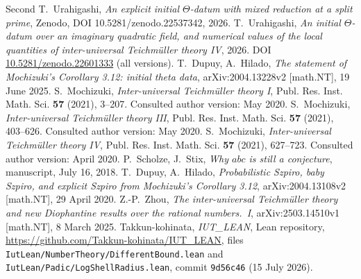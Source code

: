 \documentclass[11pt]{article}
\theoremstyle{plain}
\theoremstyle{definition}
\begin{document}
\begin{thebibliography}{Second}
 T.~Urahigashi, \emph{An explicit initial $\Theta$-datum with
 mixed reduction at a split prime}, Zenodo, DOI 10.5281/zenodo.22537342, 2026.
 T.~Urahigashi, \emph{An initial $\Theta$-datum over an
 imaginary quadratic field, and numerical values of the local quantities of
 inter-universal Teichm\"uller theory IV}, 2026.
 DOI \href{https://doi.org/10.5281/zenodo.22601333}{10.5281/zenodo.22601333}
 (all versions).
 T.~Dupuy, A.~Hilado, \emph{The statement of Mochizuki's
 Corollary 3.12: initial theta data}, arXiv:2004.13228v2 [math.NT], 19 June 2025.
 S.~Mochizuki, \emph{Inter-universal Teichm\"uller theory I},
 Publ. Res. Inst. Math. Sci. \textbf{57} (2021), 3--207.
 Consulted author version: May 2020.
 S.~Mochizuki, \emph{Inter-universal Teichm\"uller theory III},
 Publ. Res. Inst. Math. Sci. \textbf{57} (2021), 403--626.
 Consulted author version: May 2020.
 S.~Mochizuki, \emph{Inter-universal Teichm\"uller theory IV},
 Publ. Res. Inst. Math. Sci. \textbf{57} (2021), 627--723.
 Consulted author version: April 2020.
 P.~Scholze, J.~Stix, \emph{Why $abc$ is still a conjecture},
 manuscript, July 16, 2018.
 T.~Dupuy, A.~Hilado, \emph{Probabilistic Szpiro, baby Szpiro,
 and explicit Szpiro from Mochizuki's Corollary 3.12}, arXiv:2004.13108v2 [math.NT],
 29 April 2020.
 Z.-P.~Zhou, \emph{The inter-universal Teichm\"uller theory and new
 Diophantine results over the rational numbers.~I}, arXiv:2503.14510v1 [math.NT],
 8 March 2025.
 Takkun-kohinata, \emph{IUT\_LEAN}, Lean repository,
 \url{https://github.com/Takkun-kohinata/IUT_LEAN}, files
 \texttt{IutLean/NumberTheory/DifferentBound.lean} and
 \texttt{IutLean/Padic/LogShellRadius.lean}, commit \texttt{9d56c46} (15 July 2026).
\end{thebibliography}
\end{document}
